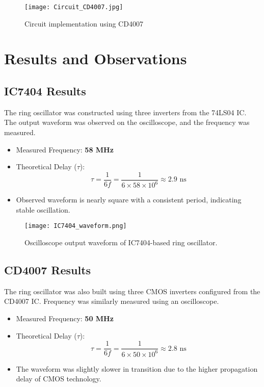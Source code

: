 \documentclass[conference]{IEEEtran}
\begin{document}
\begin{figure}[H]
\centering
\texttt{[image: Circuit\_CD4007.jpg]}
\caption{Circuit implementation using CD4007}
\label{fig:circuit_CD4007}
\end{figure}


\section{Results and Observations}

\subsection{IC7404 Results}
\noindent The ring oscillator was constructed using three inverters from the 74LS04 IC. The output waveform was observed on the oscilloscope, and the frequency was measured.

\begin{itemize}
    \item Measured Frequency: \textbf{58 MHz}
    \item Theoretical Delay ($\tau$): 
    \begin{equation}
        \tau = \frac{1}{6f} = \frac{1}{6 \times 58 \times 10^6} \approx 2.9 \text{ ns}
    \end{equation}
    \item Observed waveform is nearly square with a consistent period, indicating stable oscillation.
\end{itemize}

\begin{figure}[H]
    \centering
    \texttt{[image: IC7404\_waveform.png]}
    \caption{Oscilloscope output waveform of IC7404-based ring oscillator.}
    \label{fig:ic7404_waveform}
\end{figure}

\subsection{CD4007 Results}
\noindent The ring oscillator was also built using three CMOS inverters configured from the CD4007 IC. Frequency was similarly measured using an oscilloscope.

\begin{itemize}
    \item Measured Frequency: \textbf{50 MHz}
    \item Theoretical Delay ($\tau$): 
    \begin{equation}
        \tau = \frac{1}{6f} = \frac{1}{6 \times 50 \times 10^6} \approx 2.8 \text{ ns}
    \end{equation}
    \item The waveform was slightly slower in transition due to the higher propagation delay of CMOS technology.
\end{itemize}
\end{document}
